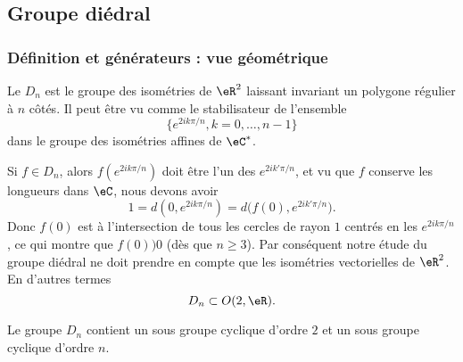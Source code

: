 \subsection{Groupe diédral}
\label{subsecHibJId}

\subsubsection{Définition et générateurs : vue géométrique}

Le  \( D_n\) est le groupe des isométries de \( \eR^2\) laissant invariant un polygone régulier à \( n\) côtés. Il peut être vu comme le stabilisateur de l'ensemble
\begin{equation}
    \{  e^{2ik\pi/n},k=0,\ldots, n-1 \}
\end{equation}
dans le groupe des isométries affines de \( \eC^*\).

Si \( f\in D_n\), alors \( f( e^{2ik\pi/n}) \) doit être l'un des \(  e^{2ik'\pi/n}\), et vu que \( f\) conserve les longueurs dans \( \eC\), nous devons avoir
\begin{equation}
    1=d(0, e^{2ik\pi/n})=d\big( f(0), e^{2ik'\pi/n} \big).
\end{equation}
Donc \( f(0)\) est à l'intersection de tous les cercles de rayon \( 1\) centrés en les \(  e^{2ik\pi/n}\), ce qui montre que \( f(0))0\) (dès que \( n\geq 3\)). Par conséquent notre étude du groupe diédral ne doit prendre en compte que les isométries vectorielles de \( \eR^2\). En d'autres termes
\begin{equation}
    D_n\subset O(2,\eR).
\end{equation}

\begin{proposition}
    Le groupe \( D_n\) contient un sous groupe cyclique d'ordre \( 2\) et un sous groupe cyclique d'ordre \( n\).
\end{proposition}

